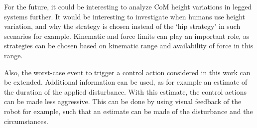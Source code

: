For the future, it could be interesting to analyze \ac{CoM} height variations in legged systems further. It would be interesting to investigate when humans use height variation, and why the strategy is chosen instead of the `hip strategy' in such scenarios for example. Kinematic and force limits can play an important role, as strategies can be chosen based on kinematic range and availability of force in this range.

Also, the worst-case event to trigger a control action considered in this work can be extended. Additional information can be used, as for example an estimate of the duration of the applied disturbance. With this estimate, the control actions can be made less aggressive. This can be done by using visual feedback of the robot for example, such that an estimate can be made of the disturbance and the circumstances. 

